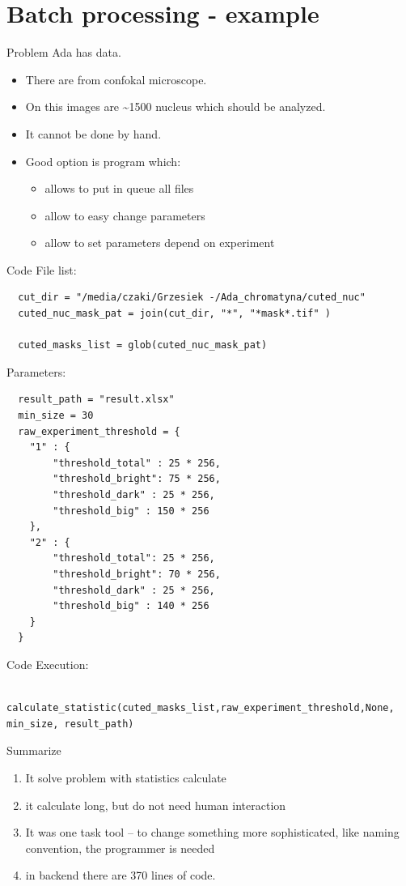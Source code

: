 \documentclass[10pt,usenames,dvipsnames]{beamer}
\begin{document}
\section{Batch processing - example}
\begin{frame}[c]{Problem}
  Ada has data. 
  \begin{itemize}
    \item There are from confokal microscope. 
    \item On this images are \textasciitilde 1500 nucleus which should be analyzed.
    \item<2-> It cannot be done by hand.
    \item<3-> Good option is program which:
      \begin{itemize}
        \item allows to put in queue all files
        \item allow to easy change parameters
        \item allow to set parameters depend on experiment
      \end{itemize}
  \end{itemize}
\end{frame}
\begin{frame}[fragile,c]{Code}
  File list:
  \begin{lstlisting}
  cut_dir = "/media/czaki/Grzesiek -/Ada_chromatyna/cuted_nuc"
  cuted_nuc_mask_pat = join(cut_dir, "*", "*mask*.tif" )
    
  cuted_masks_list = glob(cuted_nuc_mask_pat)
  \end{lstlisting}
  Parameters:
  \begin{lstlisting}
  result_path = "result.xlsx"
  min_size = 30  
  raw_experiment_threshold = {
    "1" : {
        "threshold_total" : 25 * 256,
        "threshold_bright": 75 * 256,
        "threshold_dark" : 25 * 256,
        "threshold_big" : 150 * 256
    },
    "2" : {
        "threshold_total": 25 * 256,
        "threshold_bright": 70 * 256,
        "threshold_dark" : 25 * 256,
        "threshold_big" : 140 * 256
    }
  }
  \end{lstlisting}
\end{frame}
\begin{frame}[fragile,c]{Code}
    Execution:
    \begin{lstlisting}
    calculate_statistic(cuted_masks_list,raw_experiment_threshold,None, min_size, result_path)
    \end{lstlisting}
\end{frame}
\begin{frame}[c]{Summarize}
  \begin{enumerate}
    \item It solve problem with statistics calculate
    \item it calculate long, but do not need human interaction
    \item It was one task tool – to change something more sophisticated,
      like naming convention, the programmer is needed
    \item in backend there are 370 lines of code. 
  \end{enumerate}
  
\end{frame}
\end{document}

